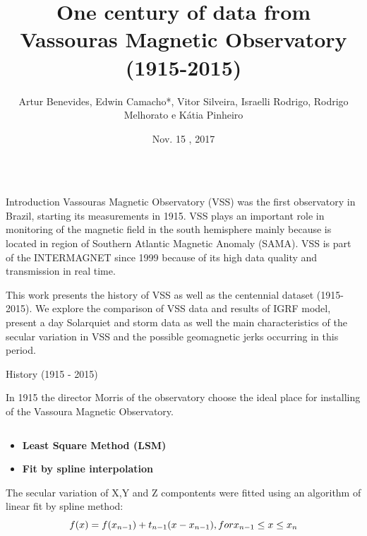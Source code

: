 \documentclass[final,t]{beamer}
\title{\huge One century of data from Vassouras Magnetic Observatory (1915-2015)}
\author[Benevides, Bassrei]{Artur Benevides, Edwin Camacho*, Vitor Silveira, Israelli Rodrigo, Rodrigo Melhorato e Kátia Pinheiro}
\institute[ON-MCTIC]{Observatório Nacional}
\date[Nov , 2017]{Nov. 15 , 2017}
\begin{document}
  \begin{columns}[t]
    \begin{column}{.66\linewidth}

\begin{block}{Introduction}
\justifying	
 Vassouras Magnetic Observatory (VSS) was the first observatory in Brazil, starting its measurements in 1915. VSS plays an important role in monitoring of the magnetic field in the south hemisphere mainly because is located in region of Southern Atlantic Magnetic Anomaly (SAMA). VSS is part of the INTERMAGNET since 1999 because of its high data quality and transmission in real time.
 
 This work presents the history of VSS as well as the centennial dataset (1915-2015). We	explore the comparison of VSS data and results of IGRF model, present a day Solarquiet and storm data as well the main characteristics of the secular variation in	VSS and the possible geomagnetic jerks occurring in this period.	
		

	
\end{block}

\begin{block}{History (1915 - 2015)}
	
In 1915 the director Morris of the observatory choose the ideal place for installing of the Vassoura Magnetic Observatory.
	
	
	
\end{block}


\begin{columns}
	\begin{column}{.31\linewidth}
	
\begin{block}{}


\begin{itemize}
\justifying
		\item \bf{Least Square Method (LSM)}
\end{itemize}

\begin{itemize}
\justifying
		\item \bf{Fit by spline interpolation}
\end{itemize}
The secular variation of X,Y and Z compontents were fitted using an algorithm  of linear fit by spline method: 
	\[ f(x)= f(x_{n-1})+t_{n-1}(x-x_{n-1}), \\
	for x_{n-1} \le x \le x_{n} \]\\


\end{block}
\end{column}
\end{columns}
\end{column}
\end{columns}
\end{document}
